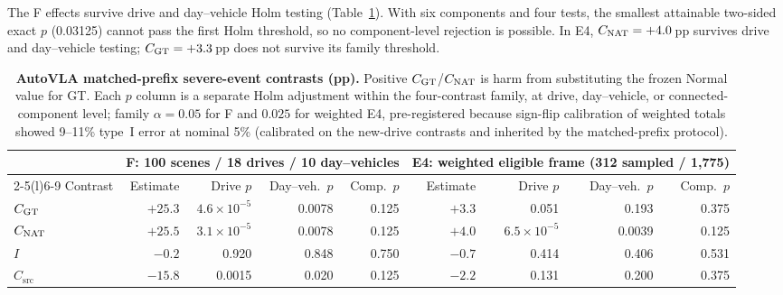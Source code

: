 The F effects survive drive and day--vehicle Holm testing (Table~\ref{tab:matched}). With six components and four tests, the smallest attainable two-sided exact $p$ (0.03125) cannot pass the first Holm threshold, so no component-level rejection is possible. In E4, $C_{\mathrm{NAT}}=+4.0$\,pp survives drive and day--vehicle testing; $C_{\mathrm{GT}}=+3.3$\,pp does not survive its family threshold.

\begin{table}[t]
\centering\small
\caption{\textbf{AutoVLA matched-prefix severe-event contrasts (pp).} Positive $C_{\mathrm{GT}}$/$C_{\mathrm{NAT}}$ is harm from substituting the frozen Normal value for GT. Each $p$ column is a separate Holm adjustment within the four-contrast family, at drive, day--vehicle, or connected-component level; family $\alpha=0.05$ for F and $0.025$ for weighted E4, pre-registered because sign-flip calibration of weighted totals showed 9--11\% type~I error at nominal 5\% (calibrated on the new-drive contrasts and inherited by the matched-prefix protocol).}
\label{tab:matched}
\setlength{\tabcolsep}{4.5pt}
\begin{tabular}{@{}lrrrrrrrr@{}}\toprule
 & \multicolumn{4}{c}{F: 100 scenes / 18 drives / 10 day--vehicles} & \multicolumn{4}{c}{E4: weighted eligible frame (312 sampled / 1,775)}\\\cmidrule(lr){2-5}\cmidrule(l){6-9}
Contrast & Estimate & Drive $p$ & Day--veh.\ $p$ & Comp.\ $p$ & Estimate & Drive $p$ & Day--veh.\ $p$ & Comp.\ $p$\\\midrule
$C_{\mathrm{GT}}$ & $+25.3$ & $4.6\!\times\!10^{-5}$ & 0.0078 & 0.125 & $+3.3$ & 0.051 & 0.193 & 0.375\\
$C_{\mathrm{NAT}}$ & $+25.5$ & $3.1\!\times\!10^{-5}$ & 0.0078 & 0.125 & $+4.0$ & $6.5\!\times\!10^{-5}$ & 0.0039 & 0.125\\
$I$ & $-0.2$ & 0.920 & 0.848 & 0.750 & $-0.7$ & 0.414 & 0.406 & 0.531\\
$C_{\mathrm{src}}$ & $-15.8$ & 0.0015 & 0.020 & 0.125 & $-2.2$ & 0.131 & 0.200 & 0.375\\\bottomrule
\end{tabular}
\end{table}


